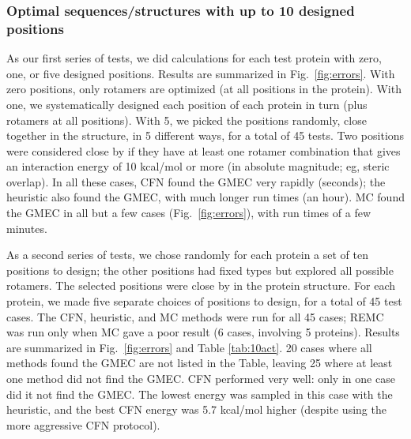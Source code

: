 {{\subsubsection{Optimal sequences/structures with up to 10 designed positions}
As our first series of tests, we did calculations for each test protein with zero, one, or five designed positions.
Results are summarized in Fig.\ \ref{fig:errors}. With zero positions, only rotamers are optimized (at all positions
in the protein). With one, we systematically designed each position of each protein in turn (plus rotamers at all
positions). With 5, we picked the positions randomly, close together in the structure, in 5 different ways, for a
total of 45 tests. Two positions were considered close by if they have at least one rotamer combination that gives
an interaction energy of 10 kcal/mol or more (in absolute magnitude; eg, steric overlap). In all these cases, CFN
found the GMEC very rapidly (seconds); the heuristic also found the GMEC, with much longer run times (an hour). MC
found the GMEC in all but a  few cases (Fig.\ \ref{fig:errors}), with run times of a few minutes. 

As a second series of tests, we chose randomly for each protein a set of ten positions to design; the other positions
had fixed types but explored all possible rotamers. The selected positions were close by in the protein structure. For
each protein, we made five separate choices of positions to design, for a total of 45 test cases. The CFN, heuristic,
and MC methods were run for all 45 cases; REMC was run only when MC gave a poor result (6 cases, involving 5 proteins).
Results are summarized in Fig.\ \ref{fig:errors} and Table \ref{tab:10act}. 20 cases where all methods found the GMEC
are not listed in the Table, leaving 25 where at least one method did not find the GMEC. CFN performed very well: only
in one case did it not find the GMEC. The lowest energy was sampled in this case with the heuristic, and the best CFN
energy was 5.7 kcal/mol higher (despite using the more aggressive CFN protocol). 

}}
